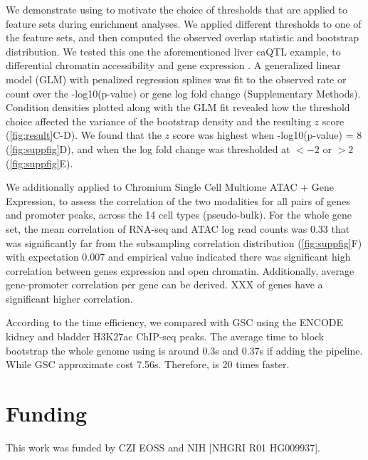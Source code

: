 We demonstrate using \bootranges to motivate the choice of thresholds 
that are applied to feature sets during enrichment analyses.
We applied different thresholds to one of the feature sets, and then 
computed the observed overlap statistic and bootstrap distribution.
We tested this one the aforementioned liver caQTL example, to
differential chromatin accessibility and gene expression 
\citep{alasoo2018shared,lee2020fluent}.
A generalized linear model (GLM) with penalized regression splines was
fit to the observed rate or count over the -log10(p-value) or gene log
fold change (Supplementary Methods). Condition densities plotted along
with the GLM fit revealed how the threshold choice affected the
variance of the bootstrap density and the resulting $z$ score
(\cref{fig:result}C-D).
We found that the $z$ score was highest when -log10(p-value) = 8
(\cref{fig:suppfig}D),
and when the log fold change was thresholded at $< -2$ or $> 2$
(\cref{fig:suppfig}E).

We additionally applied \bootranges to Chromium Single Cell Multiome
ATAC + Gene Expression, to assess the correlation of the two
modalities for all pairs of genes and promoter peaks, across the 14
cell types (pseudo-bulk).  For the whole gene set, the mean
correlation of RNA-seq and ATAC log read counts was 0.33 that was
significantly far from the subsampling correlation distribution
(\cref{fig:suppfig}F) with expectation 0.007 and empirical value
indicated there was significant high correlation between genes
expression and open chromatin. Additionally, average gene-promoter
correlation per gene can be derived. XXX of genes have a significant
higher correlation.

According to the time efficiency, we compared with GSC using the
ENCODE kidney and bladder H3K27ac ChIP-seq peaks. The average time to
block bootstrap the whole genome using \bootranges is around 0.3s and
0.37s if adding the \plyranges pipeline. While GSC approximate cost
7.56s. Therefore, \bootranges is 20 times faster.

\vspace*{-25pt}

\section*{Funding}
This work was funded by CZI EOSS and NIH [NHGRI R01 HG009937]. 

\vspace*{-25pt}
